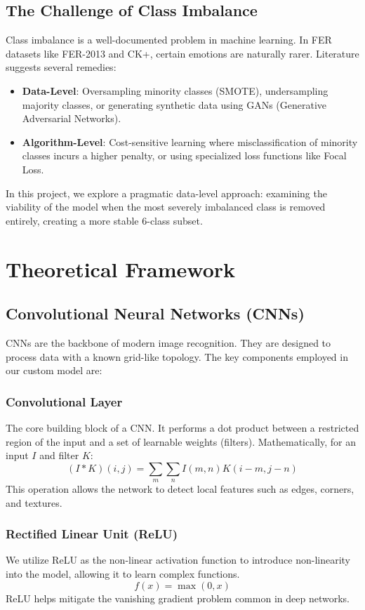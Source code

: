 \documentclass[a4paper,12pt]{article}
\begin{document}
\subsection{The Challenge of Class Imbalance}
Class imbalance is a well-documented problem in machine learning. In FER datasets like FER-2013 and CK+, certain emotions are naturally rarer. Literature suggests several remedies:
\begin{itemize}
    \item \textbf{Data-Level}: Oversampling minority classes (SMOTE), undersampling majority classes, or generating synthetic data using GANs (Generative Adversarial Networks).
    \item \textbf{Algorithm-Level}: Cost-sensitive learning where misclassification of minority classes incurs a higher penalty, or using specialized loss functions like Focal Loss.
\end{itemize}
In this project, we explore a pragmatic data-level approach: examining the viability of the model when the most severely imbalanced class is removed entirely, creating a more stable 6-class subset.

\section{Theoretical Framework}

\subsection{Convolutional Neural Networks (CNNs)}
CNNs are the backbone of modern image recognition. They are designed to process data with a known grid-like topology. The key components employed in our custom model are:

\subsubsection{Convolutional Layer}
The core building block of a CNN. It performs a dot product between a restricted region of the input and a set of learnable weights (filters). Mathematically, for an input $I$ and filter $K$:
\begin{equation}
    (I * K)(i, j) = \sum_m \sum_n I(m, n) K(i-m, j-n)
\end{equation}
This operation allows the network to detect local features such as edges, corners, and textures.

\subsubsection{Rectified Linear Unit (ReLU)}
We utilize ReLU as the non-linear activation function to introduce non-linearity into the model, allowing it to learn complex functions.
\begin{equation}
    f(x) = \max(0, x)
\end{equation}
ReLU helps mitigate the vanishing gradient problem common in deep networks.
\end{document}
